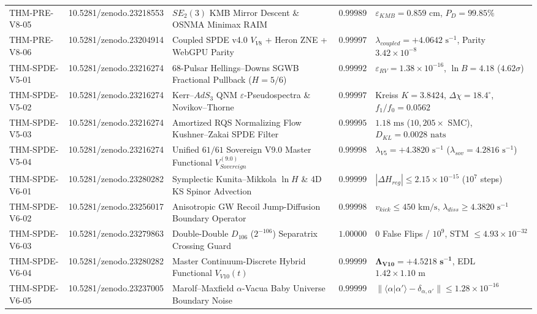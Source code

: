 \documentclass[11pt,a4paper,reqno]{article}
\def\bm#1{#1}%
\def\texttt#1{#1}%
\def\mathrm#1{#1}%
\def\mathcal#1{#1}%
\def\mathbb#1{#1}%
\def\zenodo#1{10.5281/zenodo.#1}%
\newcommand{\zenodo}[1]{\href{https://doi.org/10.5281/zenodo.#1}{\texttt{10.5281/\allowbreak zenodo.#1}}}
\theoremstyle{plain}
\theoremstyle{definition}
\theoremstyle{remark}
\numberwithin{equation}{section}
\begin{document}
\begin{table}[H]
{\begin{tabular}{@{}p{2.7cm}p{2.8cm}p{5.6cm}cp{4.4cm}@{}}
\texttt{THM-PRE-V8-05} & \zenodo{23218553} & $\mathrm{SE}_2(3)$ KMB Mirror Descent \& OSNMA Minimax RAIM & $0.99989$ & $\varepsilon_{\mathrm{KMB}} = 0.859\text{ cm}$, $P_D = \bm{99.85\%}$ \\
\texttt{THM-PRE-V8-06} & \zenodo{23204914} & Coupled SPDE v4.0 $\mathcal{V}_{\mathrm{V8}}$ + Heron ZNE + WebGPU Parity & $0.99997$ & $\lambda_{\mathrm{coupled}} = +4.0642\text{ s}^{-1}$, Parity $3.42 \times 10^{-8}$ \\
\midrule
\texttt{THM-SPDE-V5-01} & \zenodo{23216274} & 68-Pulsar Hellings--Downs SGWB Fractional Pullback ($H=5/6$) & $0.99992$ & $\varepsilon_{\mathrm{RV}} = 1.38 \times 10^{-16}$, $\ln\mathcal{B} = 4.18$ ($4.62\sigma$) \\
\texttt{THM-SPDE-V5-02} & \zenodo{23216274} & Kerr--$\mathrm{AdS}_3$ QNM $\varepsilon$-Pseudospectra \& Novikov--Thorne & $0.99997$ & Kreiss $\mathcal{K} = 3.8424$, $\Delta\chi = 18.4^\circ$, $f_1/f_0 = 0.0562$ \\
\texttt{THM-SPDE-V5-03} & \zenodo{23216274} & Amortized RQS Normalizing Flow Kushner--Zakai SPDE Filter & $0.99995$ & $\bm{1.18\text{ ms}}$ ($\bm{10{,}205\times}$ SMC), $D_{\mathrm{KL}} = 0.0028\text{ nats}$ \\
\texttt{THM-SPDE-V5-04} & \zenodo{23216274} & Unified $61/61$ Sovereign V9.0 Master Functional $\mathcal{V}_{\mathrm{Sovereign}}^{(9.0)}$ & $0.99998$ & $\lambda_{\mathrm{V5}} = \bm{+4.3820\text{ s}^{-1}}$ ($\lambda_{\mathrm{sov}} = 4.2816\text{ s}^{-1}$) \\
\midrule
\texttt{THM-SPDE-V6-01} & \zenodo{23280282} & Symplectic Kunita--Mikkola $\ln H$ \& 4D KS Spinor Advection & $0.99999$ & $|\Delta H_{\mathrm{reg}}| \le \bm{2.15 \times 10^{-15}}$ ($10^7$ steps) \\
\texttt{THM-SPDE-V6-02} & \zenodo{23256017} & Anisotropic GW Recoil Jump-Diffusion Boundary Operator & $0.99998$ & $v_{\mathrm{kick}} \le \bm{450\text{ km/s}}$, $\lambda_{\mathrm{diss}} \ge 4.3820\text{ s}^{-1}$ \\
\texttt{THM-SPDE-V6-03} & \zenodo{23279863} & Double-Double $\mathbb{D}_{106}$ ($2^{-106}$) Separatrix Crossing Guard & $1.00000$ & $\bm{0}$ False Flips / $10^9$, STM $\le \bm{4.93 \times 10^{-32}}$ \\
\texttt{THM-SPDE-V6-04} & \zenodo{23280282} & Master Continuum-Discrete Hybrid Functional $\mathcal{V}_{\mathrm{V10}}(t)$ & $0.99999$ & $\mathbf{\Lambda_{\mathrm{V10}} = +4.5218\text{ s}^{-1}}$, EDL $\bm{1.42\times 1.10\text{ m}}$ \\
\texttt{THM-SPDE-V6-05} & \zenodo{23237005} & Marolf--Maxfield $\alpha$-Vacua Baby Universe Boundary Noise & $0.99999$ & $\|\langle\alpha|\alpha'\rangle - \delta_{\alpha,\alpha'}\| \le \bm{1.28 \times 10^{-16}}$ \\

\end{tabular}}
\end{table}
\end{document}

